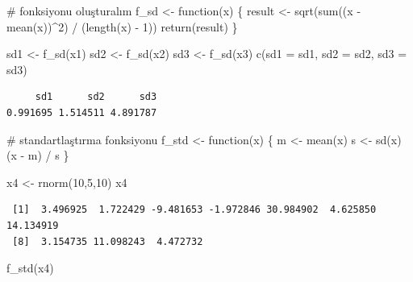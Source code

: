 \documentclass[
  letterpaper,
  DIV=11,
  numbers=noendperiod]{scrreprt}
\newenvironment{Shaded}{\begin{snugshade}}{\end{snugshade}}
\newcommand{\AttributeTok}[1]{\textcolor[rgb]{0.40,0.45,0.13}{#1}}
\newcommand{\CommentTok}[1]{\textcolor[rgb]{0.37,0.37,0.37}{#1}}
\newcommand{\ControlFlowTok}[1]{\textcolor[rgb]{0.00,0.23,0.31}{#1}}
\newcommand{\DecValTok}[1]{\textcolor[rgb]{0.68,0.00,0.00}{#1}}
\newcommand{\FunctionTok}[1]{\textcolor[rgb]{0.28,0.35,0.67}{#1}}
\newcommand{\NormalTok}[1]{\textcolor[rgb]{0.00,0.23,0.31}{#1}}
\newcommand{\OtherTok}[1]{\textcolor[rgb]{0.00,0.23,0.31}{#1}}
\newcommand{\SpecialCharTok}[1]{\textcolor[rgb]{0.37,0.37,0.37}{#1}}
\begin{document}
\begin{Shaded}
\begin{Highlighting}[]
\CommentTok{\# fonksiyonu oluşturalım}
\NormalTok{f\_sd }\OtherTok{\textless{}{-}} \ControlFlowTok{function}\NormalTok{(x) \{}
\NormalTok{  result }\OtherTok{\textless{}{-}} \FunctionTok{sqrt}\NormalTok{(}\FunctionTok{sum}\NormalTok{((x }\SpecialCharTok{{-}} \FunctionTok{mean}\NormalTok{(x))}\SpecialCharTok{\^{}}\DecValTok{2}\NormalTok{) }\SpecialCharTok{/}\NormalTok{ (}\FunctionTok{length}\NormalTok{(x) }\SpecialCharTok{{-}} \DecValTok{1}\NormalTok{))}
  \FunctionTok{return}\NormalTok{(result)}
\NormalTok{\}}

\NormalTok{sd1 }\OtherTok{\textless{}{-}} \FunctionTok{f\_sd}\NormalTok{(x1)}
\NormalTok{sd2 }\OtherTok{\textless{}{-}} \FunctionTok{f\_sd}\NormalTok{(x2)}
\NormalTok{sd3 }\OtherTok{\textless{}{-}} \FunctionTok{f\_sd}\NormalTok{(x3)}
\FunctionTok{c}\NormalTok{(}\AttributeTok{sd1 =}\NormalTok{ sd1, }\AttributeTok{sd2 =}\NormalTok{ sd2, }\AttributeTok{sd3 =}\NormalTok{ sd3)}
\end{Highlighting}
\end{Shaded}

\begin{verbatim}
     sd1      sd2      sd3 
0.991695 1.514511 4.891787 
\end{verbatim}

\begin{Shaded}
\begin{Highlighting}[]
\CommentTok{\# standartlaştırma fonksiyonu}
\NormalTok{f\_std }\OtherTok{\textless{}{-}} \ControlFlowTok{function}\NormalTok{(x) \{}
\NormalTok{m }\OtherTok{\textless{}{-}} \FunctionTok{mean}\NormalTok{(x)}
\NormalTok{s }\OtherTok{\textless{}{-}} \FunctionTok{sd}\NormalTok{(x)}
\NormalTok{(x }\SpecialCharTok{{-}}\NormalTok{ m) }\SpecialCharTok{/}\NormalTok{ s}
\NormalTok{\}}

\NormalTok{x4 }\OtherTok{\textless{}{-}} \FunctionTok{rnorm}\NormalTok{(}\DecValTok{10}\NormalTok{,}\DecValTok{5}\NormalTok{,}\DecValTok{10}\NormalTok{)}
\NormalTok{x4}
\end{Highlighting}
\end{Shaded}

\begin{verbatim}
 [1]  3.496925  1.722429 -9.481653 -1.972846 30.984902  4.625850 14.134919
 [8]  3.154735 11.098243  4.472732
\end{verbatim}

\begin{Shaded}
\begin{Highlighting}[]
\FunctionTok{f\_std}\NormalTok{(x4)}
\end{Highlighting}
\end{Shaded}
\end{document}

